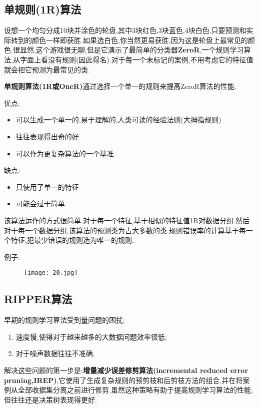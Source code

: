\documentclass[11pt,a4paper,oneside]{book}
\begin{document}
\subsection{单规则(1R)算法}
设想一个均匀分成10块并涂色的轮盘,其中3块红色,3块蓝色,4块白色.只要预测和实际转到的颜色一样即获胜.如果选白色,你当然更易获胜,因为这是轮盘上最常见的颜色.很显然,这个游戏很无聊,但是它演示了最简单的分类器\textbf{ZeroR},一个规则学习算法,从字面上看没有规则(因此得名).对于每一个未标记的案例,不用考虑它的特征值就会把它预测为最常见的类.

\textbf{单规则算法(1R或OneR)}通过选择一个单一的规则来提高ZeroR算法的性能.
\begin{tcolorbox}[colback=pink!10!white,colframe=pink!100!black]
优点:
\begin{itemize}
	\item 可以生成一个单一的,易于理解的,人类可读的经验法则(大拇指规则)
	\item 往往表现得出奇的好
	\item 可以作为更复杂算法的一个基准
\end{itemize}
缺点:
\begin{itemize}
	\item 只使用了单一的特征
	\item 可能会过于简单
\end{itemize}
\end{tcolorbox}
该算法运作的方式很简单.对于每一个特征,基于相似的特征值1R对数据分组.然后对于每一个数据分组,该算法的预测类为占大多数的类.规则错误率的计算基于每一个特征,犯最少错误的规则选为唯一的规则.

例子:
\begin{figure}[H]
	\centering
	\texttt{[image: 20.jpg]}
\end{figure}
\subsection{RIPPER算法}
早期的规则学习算法受到量问题的困扰:
\begin{enumerate}
	\item 速度慢,使得对于越来越多的大数据问题效率很低;
	\item 对于噪声数据往往不准确.
\end{enumerate}

解决这些问题的第一步是:\textbf{增量减少误差修剪算法(incremental reduced error pruning,IREP)},它使用了生成复杂规则的预剪枝和后剪枝方法的组合,并在将案例从全部收据集分离之前进行修剪.虽然这种策略有助于提高规则学习算法的性能,但往往还是决策树表现得更好.
\end{document}
